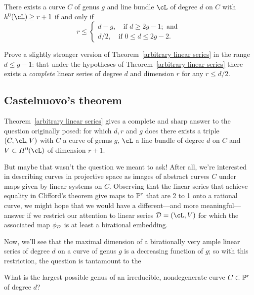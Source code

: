 \begin{theorem}\label{arbitrary linear series}
There exists a curve $C$ of genus $g$ and line bundle $\cL$ of degree $d$ on $C$ with $h^0(\cL) \geq r+1$ if and only if
$$
r \leq
\begin{cases}
d-g, \quad \text{if } d \geq 2g-1; \text{ and} \\
d/2,  \quad \text{if } 0 \leq d \leq 2g-2.
\end{cases}
$$
\end{theorem}

\begin{exercise}
Prove a slightly stronger version of Theorem~\ref{arbitrary linear series} in the range $d \leq g-1$: that under the hypotheses of Theorem~\ref{arbitrary linear series} there exists a \emph{complete} linear series of degree $d$ and dimension $r$ for any $r \leq d/2$.
\end{exercise}

\subsection{Castelnuovo's theorem}

Theorem~\ref{arbitrary linear series} gives a complete and sharp answer to the question originally posed: for which $d,r$ and $g$ does there exists a triple $(C,\cL,V)$ with $C$ a curve of genus $g$, $\cL$ a line bundle of degree $d$ on $C$ and $V \subset H^0(\cL)$ of dimension $r+1$. 

But maybe that wasn't the question we meant to ask! After all, we're interested in describing curves in projective space as images of abstract curves $C$ under maps given by linear systems on $C$. Observing that the linear series that achieve equality in Clifford's theorem give maps to $\PP^r$ that are 2 to 1 onto a rational curve, we might hope that we would have a different---and more meaningful---answer if we  restrict our attention to linear series $\cD = (\cL,V)$ for which the associated map $\phi_\cD$ is at least a birational embedding. 

Now, we'll see that the maximal dimension of a birationally very ample linear series of degree $d$ on a curve of genus $g$ is a decreasing function of $g$; so with this restriction, the question is tantamount to the

\begin{question}
What is the largest possible genus of an irreducible, nondegenerate curve $C \subset \PP^r$ of degree $d$?
\end{question}

